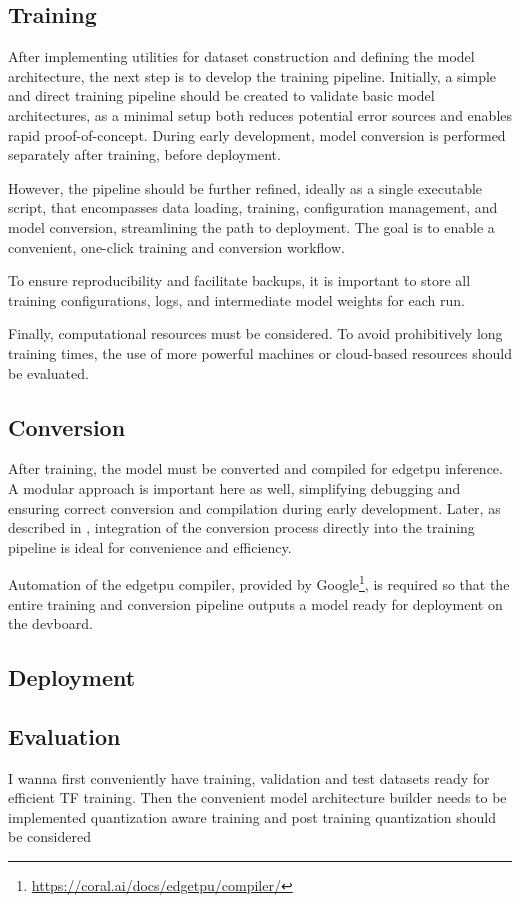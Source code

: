 {\subsection{Training}
\label{subsec:designtrain}

After implementing utilities for dataset construction and defining the model architecture, the next step is to develop the training pipeline.
Initially, a simple and direct training pipeline should be created to validate basic model architectures, as a minimal setup both reduces potential error sources and enables rapid proof-of-concept.
During early development, model conversion is performed separately after training, before deployment.

However, the pipeline should be further refined, ideally as a single executable script, that encompasses data loading, training, configuration management, and model conversion,
streamlining the path to deployment. The goal is to enable a convenient, one-click training and conversion workflow.

To ensure reproducibility and facilitate backups, it is important to store all training configurations, logs, and intermediate model weights for each run.

Finally, computational resources must be considered. To avoid prohibitively long training times, the use of more powerful machines or cloud-based resources should be evaluated.

\subsection{Conversion}

After training, the model must be converted and compiled for \gls{edgetpu} inference.
A modular approach is important here as well, simplifying debugging and ensuring correct conversion and compilation during early development.
Later, as described in , integration of the conversion process directly into the training pipeline is ideal for convenience and efficiency.

Automation of the \gls{edgetpu} compiler,
provided by Google\footnote{\url{https://coral.ai/docs/edgetpu/compiler/}},
is required so that the entire training and conversion pipeline outputs a model ready for deployment on the \gls{devboard}.

\subsection{Deployment}
\subsection{Evaluation}
I wanna first conveniently have training, validation and test datasets ready for efficient TF training.
Then the convenient model architecture builder needs to be implemented
quantization aware training and post training quantization should be considered

}